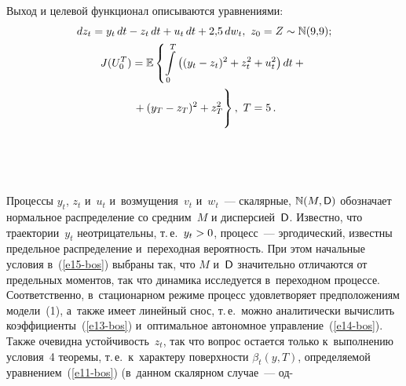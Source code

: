 \begin{multicols}{2}
     Выход и целевой функционал описываются уравнениями:
     \begin{gather*}
     dz_t = y_t\,dt-z_t\,dt+u_t\,dt+2{,}5\,dw_t, \ z_0=Z\sim \mathbb{N}(9{,}9);\hspace*{-0.48953pt}\\
     J(U_0^{{T}}) = \mathbb{E}\left\{ \int\limits_0^{{T}} \left( (y_t-z_t)^2 
+z_t^2+u_t^2\right)dt +{}\right.\\
\left.{}+(y_T-z_T)^2 +z_T^2
\vphantom{\int\limits_0^{{T}}}
\right\},\ T=5\,.
     \end{gather*}
     
      \begin{figure*} %
     \vspace*{1pt}
     \begin{minipage}[t]{80mm}
      \begin{center}
     \mbox{%
\epsfxsize=79mm 
}
\end{center}
\vspace*{-9pt}
  \vspace*{3pt}
  \end{minipage}
   \hfill   
\vspace*{1pt}
\begin{minipage}[t]{80mm}
      \begin{center}
     \mbox{%
\epsfxsize=79.055mm 
}
\end{center}
\vspace*{-9pt}
\vspace*{3pt}
  \end{minipage}
\end{figure*}

 
     
     Процессы $y_t$, $z_t$ и~$u_t$ и~возмущения~$v_t$ и~$w_t$~--- 
скалярные, $\mathbb{N}(M,{\sf D})$ обозначает нормальное распределение со 
средним~$M$ и дисперсией~${\sf D}$. Известно, что траектории~$y_t$ 
неотрицательны, т.\,е.\ $y_t\hm>0$, процесс~--- эргодический, известны 
предельное распределение и~переходная ве\-ро\-ят\-ность. При этом начальные 
условия в~(\ref{e15-bos}) выбраны так, что $M$ и~${\sf D}$ значительно отличаются 
от предельных моментов, так что динамика ис\-сле\-ду\-ет\-ся в~переходном 
процессе. Соответственно, в~стационарном режиме процесс удовле\-тво\-ря\-ет 
предположениям модели~(1), а~также имеет линейный снос, т.\,е.\ мож\-но 
аналитически вычислить коэффициенты~(\ref{e13-bos}) и~оптимальное 
автономное управ\-ле\-ние~(\ref{e14-bos}). Также очевидна устой\-чи\-вость~$z_t$, 
так что вопрос остается только к~выполнению условия~4 тео\-ре\-мы, т.\,е.\ 
к~характеру по\-верх\-ности $\beta_t(y,T)$, опре\-де\-ля\-емой  
уравнением~(\ref{e11-bos}) (в~данном скалярном случае~--- од-\linebreak\vspace*{-12pt}


\end{multicols}
